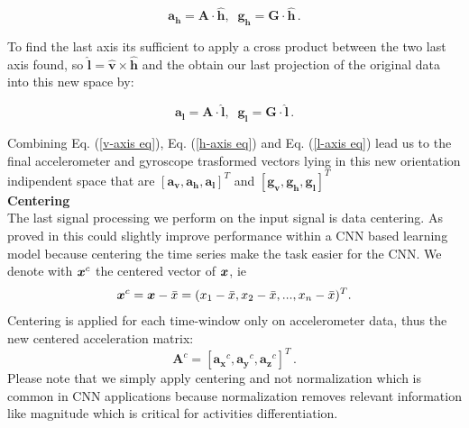 \begin{equation}
	\label{h-axis eq}
	\boldsymbol{a_{h}} = \boldsymbol{A} \cdot \boldsymbol{\hat{h}} , \;\; \boldsymbol{g_{h}} = \boldsymbol{G} \cdot \boldsymbol{\hat{h}} \,.
\end{equation}

To find the last axis its sufficient to apply a cross product between the two last axis found, so $ \boldsymbol{\hat{l}} = \boldsymbol{\hat{v}} \times \boldsymbol{\hat{h}} $ and the obtain our last projection of the original data into this new space by:

\begin{equation}
	\label{l-axis eq}
	\boldsymbol{a_{l}} = \boldsymbol{A} \cdot \boldsymbol{\hat{l}} , \;\; \boldsymbol{g_{l}} = \boldsymbol{G} \cdot \boldsymbol{\hat{l}} \,.
\end{equation}



Combining Eq. (\ref{v-axis eq}), Eq. (\ref{h-axis eq}) and Eq. (\ref{l-axis eq}) lead us to the final accelerometer and gyroscope trasformed vectors lying in this new orientation indipendent space that are $[\boldsymbol{a_{v}}, \boldsymbol{a_{h}}, \boldsymbol{a_{l}}]^T $ and $ [\boldsymbol{g_{v}}, \boldsymbol{g_{h}}, \boldsymbol{g_{l}}]^T $ \\

\textbf{Centering}\\

The last signal processing we perform on the input signal is data
centering. As proved in \cite{ignatov2018real} this could slightly
improve performance within a CNN based learning model because
centering the time series make the task easier for the CNN. We denote with $\boldsymbol{x}^{c}$ the centered vector of $\boldsymbol{x}$, ie
\begin{equation}
  \label{eq:centering-func}
  \x^{c} = \x - \bar{x} = (x_1-\bar{x}, x_2-\bar{x},..., x_n-\bar{x})^T.
\end{equation}
Centering is applied for each time-window only on accelerometer data, thus the new centered acceleration matrix:
\begin{equation}
  \label{eq:centering-accelerometer-data}
  \boldsymbol{A}^{c} = [\boldsymbol{a_{x}}^{c}, \boldsymbol{a_{y}}^{c}, \boldsymbol{a_{z}}^{c}]^T \,.
\end{equation}
Please note that we simply apply centering and not normalization which is common in CNN applications because normalization removes relevant information like magnitude which is critical for activities differentiation.

